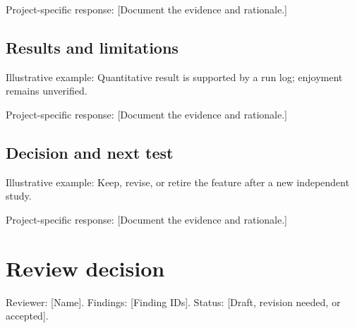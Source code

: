 \documentclass[11pt]{article}
\begin{document}
Project-specific response: [Document the evidence and rationale.]


\subsection{Results and limitations}
Illustrative example: Quantitative result is supported by a run log; enjoyment remains unverified.

Project-specific response: [Document the evidence and rationale.]


\subsection{Decision and next test}
Illustrative example: Keep, revise, or retire the feature after a new independent study.

Project-specific response: [Document the evidence and rationale.]


\section{Review decision}
Reviewer: [Name]. Findings: [Finding IDs]. Status: [Draft, revision needed, or accepted].
\end{document}
